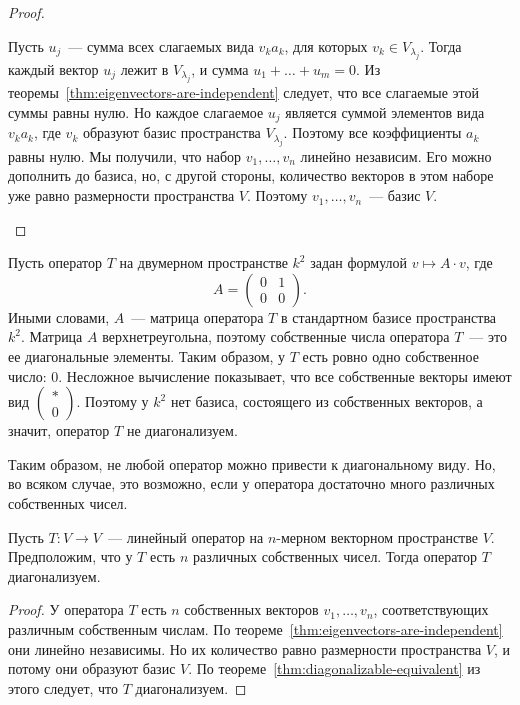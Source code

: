 \begin{proof}
\begin{itemize}
Пусть $u_j$~--- сумма всех слагаемых вида $v_ka_k$, для которых
$v_k\in V_{\lambda_j}$. Тогда каждый вектор $u_j$ лежит
в $V_{\lambda_j}$, и сумма $u_1+\dots+u_m = 0$.
Из теоремы~\ref{thm:eigenvectors-are-independent} следует,
что все слагаемые этой суммы равны нулю. Но каждое слагаемое
$u_j$ является суммой элементов вида $v_ka_k$, где $v_k$ образуют
базис пространства $V_{\lambda_j}$. Поэтому все коэффициенты
$a_k$ равны нулю. Мы получили, что набор $v_1,\dots,v_n$ линейно
независим. Его можно дополнить до базиса, но, с другой стороны,
количество векторов в этом наборе уже равно размерности
пространства $V$. Поэтому $v_1,\dots,v_n$~--- базис $V$.
\end{itemize}
\end{proof}

\begin{example}
Пусть оператор $T$ на двумерном пространстве $k^2$ задан формулой
$v\mapsto A\cdot v$, где
$$
A = \begin{pmatrix} 0 & 1 \\ 0 & 0\end{pmatrix}.
$$
Иными словами, $A$~--- матрица оператора $T$ в стандартном
базисе пространства $k^2$.
Матрица $A$ верхнетреугольна, поэтому собственные числа оператора
$T$~--- это ее диагональные элементы. Таким образом, у $T$
есть ровно одно собственное число: $0$. Несложное вычисление показывает,
что все собственные векторы имеют вид $\begin{pmatrix} * \\ 0\end{pmatrix}$. Поэтому у $k^2$ нет базиса, состоящего из собственных
векторов, а значит, оператор $T$ не диагонализуем.
\end{example}

Таким образом, не любой оператор можно привести к диагональному виду.
Но, во всяком случае, это возможно, если у оператора достаточно
много различных собственных чисел.
\begin{corollary}
Пусть $T\colon V\to V$~--- линейный оператор на $n$-мерном векторном
пространстве $V$. Предположим, что у $T$ есть $n$ различных
собственных чисел. Тогда оператор $T$ диагонализуем.
\end{corollary}
\begin{proof}
У оператора $T$ есть $n$ собственных векторов $v_1,\dots,v_n$,
соответствующих различным собственным числам.
По теореме~\ref{thm:eigenvectors-are-independent} они
линейно независимы. Но их количество равно размерности пространства
$V$, и потому они образуют базис $V$. По
теореме~\ref{thm:diagonalizable-equivalent}
из этого следует, что $T$ диагонализуем.
\end{proof}

